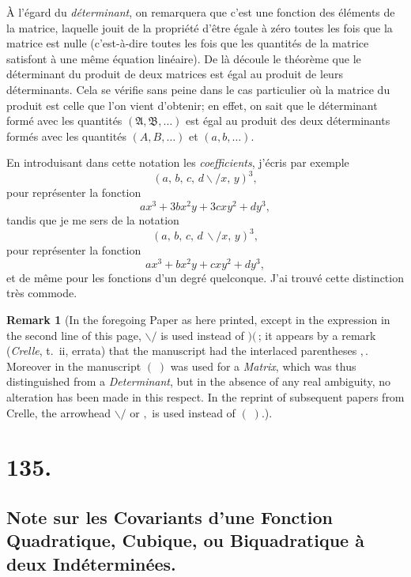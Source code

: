 \documentclass[11pt,a4paper]{book}
\newtheorem*{remark}{Remark}
\providecommand{\between}{,}
\begin{document}
\medskip

\`A l'\'egard du \textit{d\'eterminant}, on remarquera que c'est une
fonction des \'el\'ements de la matrice, laquelle jouit de la propri\'et\'e
d'\^etre \'egale \`a z\'ero toutes les fois que la matrice est nulle (c'est-\`a-dire
toutes les fois que les quantit\'es de la matrice satisfont \`a une m\^eme
\'equation lin\'eaire). De l\`a d\'ecoule le th\'eor\`eme que le d\'eterminant
du produit de deux matrices est \'egal au produit de leurs d\'eterminants.
Cela se v\'erifie sans peine dans le cas particulier o\`u la matrice du
produit est celle que l'on vient d'obtenir; en effet, on sait que le
d\'eterminant form\'e avec les quantit\'es $(\mathfrak{A},\mathfrak{B},\ldots)$
est \'egal au produit des deux d\'eterminants form\'es avec les quantit\'es
$(A, B,\ldots)$ et $(a, b,\ldots)$.

\medskip

En introduisant dans cette notation les \textit{coefficients}, j'\'ecris
par exemple
\[
(a,\, b,\, c,\, d\!\!\backslash\!\!\!/ x,\, y)^3,
\]
pour repr\'esenter la fonction
\[
ax^3 + 3bx^2y + 3cxy^2 + dy^3,
\]
tandis que je me sers de la notation
\[
(a,\, b,\, c,\, d\,\backslash\!\!\!/ x,\, y)^3,
\]
pour repr\'esenter la fonction
\[
ax^3 + bx^2y + cxy^2 + dy^3,
\]
et de m\^eme pour les fonctions d'un degr\'e quelconque. J'ai trouv\'e cette
distinction tr\`es commode.

\begin{remark}
[In the foregoing Paper as here printed, except in the expression in the
second line of this page, $\backslash\!\!\!/$ is used instead of $)(\,$;
it appears by a remark (\textit{Crelle}, t.~ii, errata) that the
manuscript had the interlaced parentheses $\between$. Moreover in the
manuscript $(\;)$ was used for a \textit{Matrix}, which was thus
distinguished from a \textit{Determinant}, but in the absence of any real
ambiguity, no alteration has been made in this respect. In the reprint of
subsequent papers from Crelle, the arrowhead $\backslash\!\!\!/$ or
$\between$ is used instead of $(\;)$.]
\end{remark}

\newpage
\section*{135.}
\subsection*{Note sur les Covariants d'une Fonction Quadratique, Cubique, ou Biquadratique \`a deux Ind\'etermin\'ees.}
\end{document}
